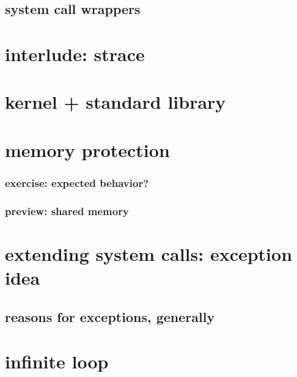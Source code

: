 \subsection{system call wrappers}

% 

\section{interlude: strace}


\section{kernel + standard library}

\section{memory protection}

\subsubsection{exercise: expected behavior?}


\subsubsection{preview: shared memory}


\section{extending system calls: exception idea}


\subsection{reasons for exceptions, generally}


\section{infinite loop}


